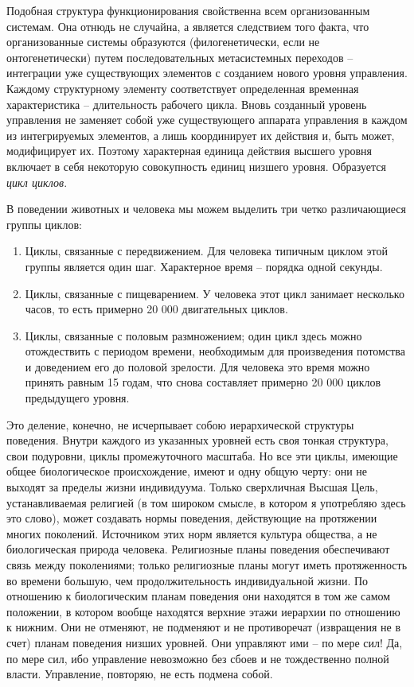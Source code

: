 \documentclass{book}
\begin{document}
Подобная структура функционирования свойственна всем организованным системам. Она отнюдь не случайна, а являет­ся следствием того факта, что организованные системы образуются (филогенетически, если не онтогенетически) путем последовательных метасистемных переходов -- интеграции уже существующих элементов с созданием нового уровня управления. Каждому структурному элементу соответствует определенная временная характеристика -- длительность рабочего цик­ла. Вновь созданный уровень управления не заменяет собой уже существующего аппарата управления в каждом из интегрируемых элементов, а лишь координирует их действия и, быть может, модифицирует их. Поэтому характерная единица действия высшего уровня включает в себя некоторую совокуп­ность единиц низшего уровня. Образуется \textit{цикл циклов}. 

В поведении животных и человека мы можем выделить три четко различающиеся группы циклов:
\begin{enumerate}
 \item Циклы, связанные с передвижением. Для человека типич­ным циклом этой группы является один шаг. Характерное время -- порядка одной секунды.
 \item Циклы, связанные с пищеварением. У человека этот цикл занимает несколько часов, то есть примерно 20 000 двигатель­ных циклов.
 \item Циклы, связанные с половым размножением; один цикл здесь можно отождествить с периодом времени, необходимым для произведения потомства и доведением его до половой зрелости. Для человека это время можно принять равным 15 годам, что снова составляет примерно 20 000 циклов преды­дущего уровня.
\end{enumerate}

Это деление, конечно, не исчерпывает собою иерархической структуры поведения. Внутри каждого из указанных уровней есть своя тонкая структура, свои подуровни, циклы промежуточного масштаба. Но все эти циклы, имеющие общее биоло­гическое происхождение, имеют и одну общую черту: они не выходят за пределы жизни индивидуума. Только сверхличная Высшая Цель, устанавливаемая религией (в том широком смысле, в котором я употребляю здесь это слово), может со­здавать нормы поведения, действующие на протяжении многих поколений. Источником этих норм является культура общества, а не биологическая природа человека. Религиозные планы поведения обеспечивают связь между поколениями; только религиозные планы могут иметь протяженность во времени большую, чем продолжительность индивидуальной жизни. По отношению к биологическим планам поведения они находятся в том же самом положении, в котором вообще находятся верхние этажи иерархии по отношению к нижним. Они не отменяют, не подменяют и не противоречат (извращения не в счет) 
пла­нам поведения низших уровней. Они управляют ими -- по мере сил! Да, по мере сил, ибо управление невозможно без сбоев и не тождественно полной власти. Управление, повторяю, не есть подмена собой.
\end{document}
